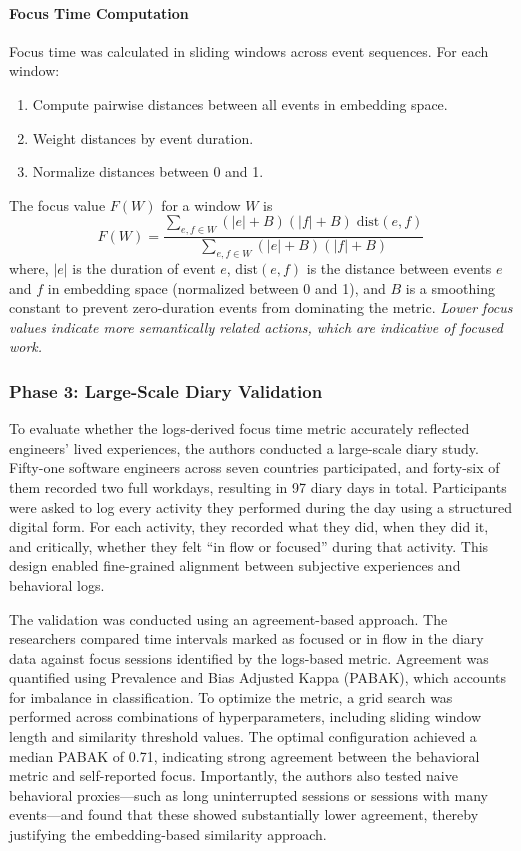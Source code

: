 \paragraph{Focus Time Computation}
Focus time was calculated in sliding windows across event sequences. For each window:
\begin{enumerate}
    \item Compute pairwise distances between all events in embedding space.
    \item Weight distances by event duration.
    \item Normalize distances between 0 and 1.
\end{enumerate}
The focus value $F(W)$ for a window $W$ is
\begin{equation}
    F(W) = \frac{\sum_{e,f \in W} (|e| + B)(|f| + B)\;\text{dist}(e,f)}{\sum_{e,f \in W} (|e| + B)(|f| + B)}
\end{equation}
where, $|e|$ is the duration of event $e$, $\text{dist}(e,f)$ is the distance between events $e$ and $f$ in embedding space (normalized between 0 and 1), and $B$ is a smoothing constant to prevent zero-duration events from dominating the metric. \textit{Lower focus values indicate more semantically related actions, which are indicative of focused work.}

\subsubsection{Phase 3: Large-Scale Diary Validation}
To evaluate whether the logs-derived focus time metric accurately reflected engineers’ lived experiences, the authors conducted a large-scale diary study. Fifty-one software engineers across seven countries participated, and forty-six of them recorded two full workdays, resulting in 97 diary days in total. Participants were asked to log every activity they performed during the day using a structured digital form. For each activity, they recorded what they did, when they did it, and critically, whether they felt “in flow or focused” during that activity. This design enabled fine-grained alignment between subjective experiences and behavioral logs.

The validation was conducted using an agreement-based approach. The researchers compared time intervals marked as focused or in flow in the diary data against focus sessions identified by the logs-based metric. Agreement was quantified using Prevalence and Bias Adjusted Kappa (PABAK), which accounts for imbalance in classification. To optimize the metric, a grid search was performed across combinations of hyperparameters, including sliding window length and similarity threshold values. The optimal configuration achieved a median PABAK of 0.71, indicating strong agreement between the behavioral metric and self-reported focus. Importantly, the authors also tested naive behavioral proxies—such as long uninterrupted sessions or sessions with many events—and found that these showed substantially lower agreement, thereby justifying the embedding-based similarity approach.


